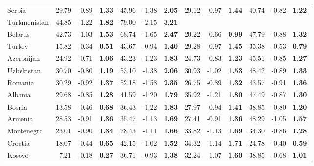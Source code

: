 \documentclass[a4paper]{article}
\begin{document}
\begin{table}[ht]
{\begin{tabular}{lrrrrrrrrrrrr}
Serbia & 29.79 & -0.89 & \textbf{1.33} & 45.96 & -1.38 & \textbf{2.05} & 29.12 & -0.97 & \textbf{1.44} & 40.74 & -0.82 & \textbf{1.22} \\ 
Turkmenistan & 44.85 & -1.22 & \textbf{1.82} & 79.00 & -2.15 & \textbf{3.21} &  &  &  &  &  &  \\ 
Belarus & 42.73 & -1.03 & \textbf{1.53} & 68.74 & -1.65 & \textbf{2.47} & 20.22 & -0.66 & \textbf{0.99} & 47.79 & -0.88 & \textbf{1.32} \\ 
Turkey & 15.82 & -0.34 & \textbf{0.51} & 43.67 & -0.94 & \textbf{1.40} & 29.28 & -0.97 & \textbf{1.45} & 35.38 & -0.53 & \textbf{0.79} \\ 
Azerbaijan & 24.92 & -0.71 & \textbf{1.06} & 43.23 & -1.23 & \textbf{1.83} & 24.73 & -0.83 & \textbf{1.23} & 45.51 & -0.85 & \textbf{1.27} \\ 
Uzbekistan & 30.70 & -0.80 & \textbf{1.19} & 53.10 & -1.38 & \textbf{2.06} & 30.93 & -1.02 & \textbf{1.53} & 48.42 & -0.89 & \textbf{1.33} \\ 
Romania & 30.29 & -0.92 & \textbf{1.37} & 52.18 & -1.58 & \textbf{2.35} & 26.75 & -0.89 & \textbf{1.32} & 43.57 & -0.91 & \textbf{1.36} \\ 
Albania & 29.68 & -0.85 & \textbf{1.28} & 41.59 & -1.20 & \textbf{1.79} & 35.92 & -1.21 & \textbf{1.80} & 47.49 & -0.87 & \textbf{1.30} \\ 
Bosnia & 13.58 & -0.46 & \textbf{0.68} & 36.43 & -1.22 & \textbf{1.83} & 27.97 & -0.94 & \textbf{1.41} & 38.85 & -0.80 & \textbf{1.20} \\ 
Armenia & 28.53 & -0.91 & \textbf{1.36} & 35.47 & -1.13 & \textbf{1.69} & 27.41 & -0.91 & \textbf{1.36} & 48.29 & -1.05 & \textbf{1.57} \\ 
Montenegro & 23.01 & -0.90 & \textbf{1.34} & 28.43 & -1.11 & \textbf{1.66} & 33.82 & -1.13 & \textbf{1.69} & 34.30 & -0.86 & \textbf{1.28} \\ 
Croatia & 18.07 & -0.44 & \textbf{0.65} & 42.15 & -1.02 & \textbf{1.52} & 34.32 & -1.14 & \textbf{1.71} & 24.78 & -0.40 & \textbf{0.59} \\ 
Kosovo & 7.21 & -0.18 & \textbf{0.27} & 36.71 & -0.93 & \textbf{1.38} & 32.24 & -1.07 & \textbf{1.60} & 38.85 & -0.68 & \textbf{1.01} \\ 

\end{tabular}}
\end{table}
\end{document}
